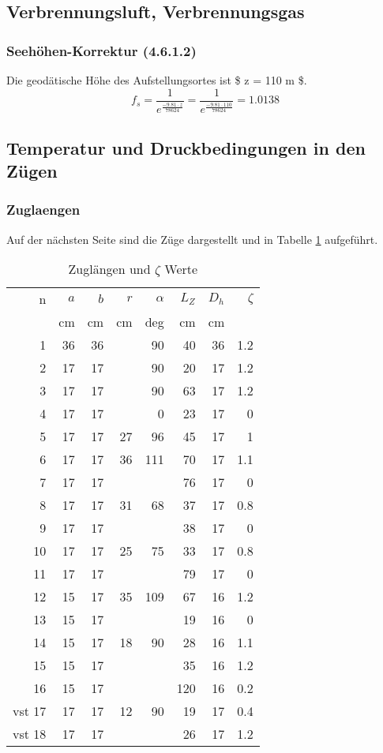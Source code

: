 \documentclass[a4paper,10pt,twoside]{article}
\begin{document}
\subsection{Verbrennungsluft, Verbrennungsgas}
\label{sec:org433f19b}
\subsubsection{Seehöhen-Korrektur (4.6.1.2)}
\label{sec:org8a1b0a4}
Die geodätische Höhe des Aufstellungsortes ist \$ z = 110 m \$.
\begin{equation}
f_s = \frac{1}{e^\frac{-9.81 \cdot z}{78624}} = \frac{1}{e^\frac{-9.81 \cdot 110}{78624}} = 1.0138 
\end{equation}

\subsection{Temperatur und Druckbedingungen in den Zügen}
\label{sec:org93bd527}
\subsubsection{Zuglaengen}
\label{sec:org94432d9}
Auf der nächsten Seite sind die Züge dargestellt und
in Tabelle \ref{tab:orge871124} aufgeführt.    


\begin{table}[htbp]
\caption{\label{tab:orge871124}
Zuglängen und \(\zeta\) Werte}
\centering
\begin{tabular}{rrrrrrrr}
n & \(a\) & \(b\) & \(r\) & \(\alpha\) & \(L_Z\) & \(D_h\) & \(\zeta\)\\
 & cm & cm & cm & deg & cm & cm & \\
\hline
1 & 36 & 36 &  & 90 & 40 & 36 & 1.2\\
2 & 17 & 17 &  & 90 & 20 & 17 & 1.2\\
3 & 17 & 17 &  & 90 & 63 & 17 & 1.2\\
4 & 17 & 17 &  & 0 & 23 & 17 & 0\\
5 & 17 & 17 & 27 & 96 & 45 & 17 & 1\\
6 & 17 & 17 & 36 & 111 & 70 & 17 & 1.1\\
7 & 17 & 17 &  &  & 76 & 17 & 0\\
8 & 17 & 17 & 31 & 68 & 37 & 17 & 0.8\\
9 & 17 & 17 &  &  & 38 & 17 & 0\\
10 & 17 & 17 & 25 & 75 & 33 & 17 & 0.8\\
11 & 17 & 17 &  &  & 79 & 17 & 0\\
12 & 15 & 17 & 35 & 109 & 67 & 16 & 1.2\\
13 & 15 & 17 &  &  & 19 & 16 & 0\\
14 & 15 & 17 & 18 & 90 & 28 & 16 & 1.1\\
15 & 15 & 17 &  &  & 35 & 16 & 1.2\\
16 & 15 & 17 &  &  & 120 & 16 & 0.2\\
vst 17 & 17 & 17 & 12 & 90 & 19 & 17 & 0.4\\
vst 18 & 17 & 17 &  &  & 26 & 17 & 1.2\\
\end{tabular}
\end{table}
\end{document}
